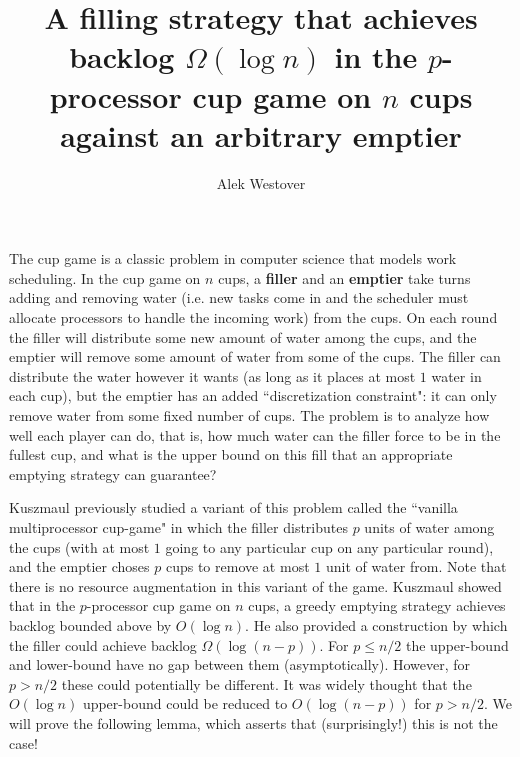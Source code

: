 \documentclass{article}[11pt]
\author{Alek Westover}
\title{ A filling strategy that achieves backlog $\Omega(\log n)$ in the $p$-processor cup game on $n$ cups against an arbitrary emptier}
\begin{document}
\maketitle

The cup game is a classic problem in computer science that models work
scheduling.  In the cup game on $n$ cups, a \textbf{filler} and an
\textbf{emptier} take turns adding and removing water (i.e. new tasks come in
and the scheduler must allocate processors to handle the incoming work) from
the cups. On each round the filler will distribute some new amount of water
among the cups, and the emptier will remove some amount of water from some of
the cups. The filler can distribute the water however it wants (as long as it
places at most $1$ water in each cup), but the emptier has an added
``discretization constraint": it can only remove water from some fixed number
of cups. The problem is to analyze how well each player can do, that is, how
much water can the filler force to be in the fullest cup, and what is the upper
bound on this fill that an appropriate emptying strategy can guarantee?

Kuszmaul previously studied a variant of this problem called the ``vanilla
multiprocessor cup-game" in which the filler distributes $p$ units of water
among the cups (with at most $1$ going to any particular cup on any particular
round), and the emptier choses $p$ cups to remove at most $1$ unit of water
from. Note that there is no resource augmentation in this variant of the game.
Kuszmaul showed that in the $p$-processor cup game on $n$ cups, a greedy
emptying strategy achieves backlog bounded above by $O(\log n)$. He also
provided a construction by which the filler could achieve backlog $\Omega(\log
(n-p))$. For $p \le n/2$ the upper-bound and lower-bound have no gap between
them (asymptotically). However, for $p > n/2$ these could potentially be
different. It was widely thought that the $O(\log n)$ upper-bound could be
reduced to $O(\log(n-p))$ for $p>n/2$. We will prove the following lemma, which
asserts that (surprisingly!) this is not the case!
\end{document}
